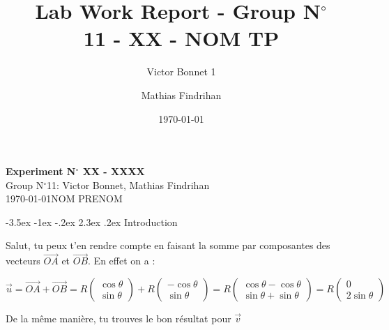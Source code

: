 \documentclass[a4paper, 12pt, oneside]{article}
\makeatletter
\renewcommand{\section}{\@startsection {section}{1}{\z@}%
             {-3.5ex \@plus -1ex \@minus -.2ex}%
             {2.3ex \@plus.2ex}%
             {\normalfont\normalsize\bfseries}}
\makeatother
\begin{document}
\title{\normalsize{Lab Work Report - Group N$^\circ$\\ 11 - XX - NOM TP}}
\date{\normalsize{\today}}
\author{\normalsize{Victor Bonnet} 1\and \normalsize{Mathias Findrihan}}


\begin{center}
\large\textbf{\sffamily Experiment N$^\circ$ XX - XXXX}\\%
\large\sffamily Group N$^\circ$11: Victor Bonnet, Mathias Findrihan\\%
\large\sffamily \today\qquad NOM PRENOM\\%
\end{center}
\section{Introduction} %


Salut, tu peux t'en rendre compte en faisant la somme par composantes des vecteurs $\vec{OA}$ et $\vec{OB}$. En effet on a : 

$$\vec{u}=\vec{OA}+\vec{OB}= R\begin{pmatrix}  \cos\theta\\ \sin\theta\end{pmatrix}+R\begin{pmatrix}  -\cos\theta\\ \sin\theta\end{pmatrix} = R\begin{pmatrix}  \cos\theta-\cos\theta\\ \sin\theta+\sin\theta\end{pmatrix}=R\begin{pmatrix} 0\\2\sin\theta\end{pmatrix}$$

De la même manière, tu trouves le bon résultat pour $\vec{v}$
\end{document}
